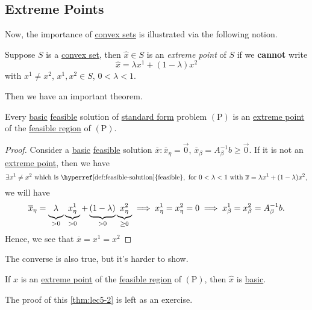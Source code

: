 \subsection{Extreme Points}
Now, the importance of \hyperref[def:convex-set]{convex sets} is illustrated via the following notion.

\begin{definition}\label{def:extreme-point}
	Suppose \(S\) is a \hyperref[def:convex-set]{convex set}, then \(\hat{x} \in S\) is an \emph{extreme point} of \(S\) if we \textbf{cannot} write
	\[
		\hat{x} = \lambda x^1 + (1-\lambda)x^2
	\]
	with \(x^1 \neq x^2\), \(x^1, x^2\in S\), \(0<\lambda<1\).
\end{definition}

Then we have an important theorem.

\begin{theorem}\label{thm:lec5-1}
	Every \hyperref[def:basic-solution]{basic} \hyperref[def:feasible-solution]{feasible} solution of \hyperref[def:standard-form]{standard form} problem \((\mathrm{P})\) is an
	\hyperref[def:extreme-point]{extreme point} of the \hyperref[def:feasible-region]{feasible region} of \((\mathrm{P})\).
\end{theorem}
\begin{proof}
	Consider a \hyperref[def:basic-solution]{basic} \hyperref[def:feasible-solution]{feasible} solution \(\overline{x}\colon \overline{x}_{\eta} = \vec{0}\),
	\(\overline{x}_{\beta} = A^{-1}_{\beta}b\geq \vec{0}\). If it is not an \hyperref[def:extreme-point]{extreme point}, then we have
	\[
		\exists x^1\neq x^2 \text{ which is \hyperref[def:feasible-solution]{feasible}}, \text{ for }0<\lambda<1\text{ with }\overline{x} = \lambda x^1 + (1-\lambda)x^2,
	\]
	we will have
	\[
		\overline{x}_{\eta} = \underbrace{\vphantom{x^1_{\eta}}\lambda}_{>0}\underbrace{x^1_{\eta}}_{>0} + \underbrace{\vphantom{x^1_{\eta}}(1-\lambda)}_{>0}\underbrace{x^2_{\eta}}_{\geq 0} \implies x^1_{\eta} = x^2_{\eta} = 0 \implies x^1_{\beta} = x^2_{\beta} = A^{-1}_{\beta}b.
	\]
	Hence, we see that \(\overline{x} = x^1 = x^2\)\conta
\end{proof}

The converse is also true, but it's harder to show.
\begin{theorem}\label{thm:lec5-2}
	If \(\hat{x}\) is an \hyperref[def:extreme-point]{extreme point} of the \hyperref[def:feasible-region]{feasible region} of \((\mathrm{P})\), then \(\hat{x}\) is
	\hyperref[def:basic-solution]{basic}.
\end{theorem}

The proof of this \autoref{thm:lec5-2} is left as an exercise.